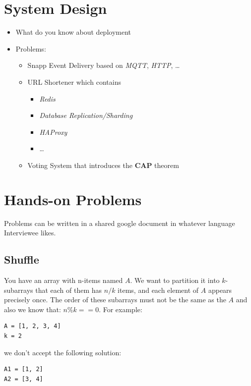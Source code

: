 \documentclass[]{book}
\begin{document}
\section{System Design}

\begin{itemize}
  \item What do you know about deployment
  \item Problems:
    \begin{itemize}
      \item Snapp Event Delivery based on \textit{MQTT}, \textit{HTTP}, \ldots
      \item URL Shortener which contains
        \begin{itemize}
          \item \textit{Redis}
          \item \textit{Database Replication/Sharding}
          \item \textit{HAProxy}
          \item \ldots
        \end{itemize}
      \item Voting System that introduces the \textbf{CAP} theorem
    \end{itemize}
\end{itemize}

\section{Hands-on Problems}

Problems can be written in a shared google document in whatever language Interviewee likes.

\subsection{Shuffle}

You have an array with n-items named $A$.
We want to partition it into $k$-subarrays that each of them has $n/k$ items, and each element of $A$ appears precisely once.
The order of these subarrays must not be the same as the $A$ and also we know that: $n \% k == 0$.
For example:

\begin{verbatim}
A = [1, 2, 3, 4]
k = 2
\end{verbatim}

we don't accept the following solution:

\begin{verbatim}
A1 = [1, 2]
A2 = [3, 4]
\end{verbatim}
\end{document}
